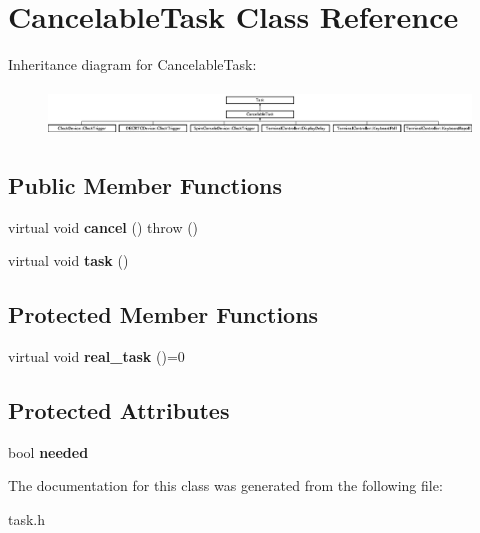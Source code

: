 \hypertarget{classCancelableTask}{
\section{CancelableTask Class Reference}
\label{classCancelableTask}
}
Inheritance diagram for CancelableTask:\begin{figure}[H]
\begin{center}
\leavevmode
\includegraphics[height=1.27273cm]{classCancelableTask}
\end{center}
\end{figure}
\subsection*{Public Member Functions}
\begin{DoxyCompactItemize}
\item 
\hypertarget{classCancelableTask_a6b653553fe3e236d01128845d4c0fcdd}{
virtual void {\bfseries cancel} ()  throw ()}
\label{classCancelableTask_a6b653553fe3e236d01128845d4c0fcdd}

\item 
\hypertarget{classCancelableTask_a3f99478c88e6a5c171b6412ebb8e8a04}{
virtual void {\bfseries task} ()}
\label{classCancelableTask_a3f99478c88e6a5c171b6412ebb8e8a04}

\end{DoxyCompactItemize}
\subsection*{Protected Member Functions}
\begin{DoxyCompactItemize}
\item 
\hypertarget{classCancelableTask_adf2a0222f39d903f8a857797b6ebb912}{
virtual void {\bfseries real\_\-task} ()=0}
\label{classCancelableTask_adf2a0222f39d903f8a857797b6ebb912}

\end{DoxyCompactItemize}
\subsection*{Protected Attributes}
\begin{DoxyCompactItemize}
\item 
\hypertarget{classCancelableTask_a7aab83aa340cf5ca2156a62bc30f7ea0}{
bool {\bfseries needed}}
\label{classCancelableTask_a7aab83aa340cf5ca2156a62bc30f7ea0}

\end{DoxyCompactItemize}


The documentation for this class was generated from the following file:\begin{DoxyCompactItemize}
\item 
task.h\end{DoxyCompactItemize}
